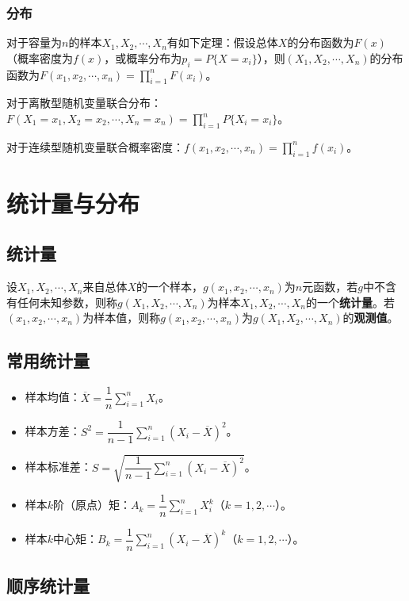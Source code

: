 \subsubsection{分布}

对于容量为$n$的样本$X_1,X_2,\cdots,X_n$有如下定理：假设总体$X$的分布函数为$F(x)$（概率密度为$f(x)$，或概率分布为$p_i=P\{X=x_i\}$），则$(X_1,X_2,\cdots,X_n)$的分布函数为$F(x_1,x_2,\cdots,x_n)=\prod\limits_{i=1}^nF(x_i)$。

对于离散型随机变量联合分布：$F(X_1=x_1,X_2=x_2,\cdots,X_n=x_n)=\prod\limits_{i=1}^nP\{X_i=x_i\}$。

对于连续型随机变量联合概率密度：$f(x_1,x_2,\cdots,x_n)=\prod\limits_{i=1}^nf(x_i)$。

\section{统计量与分布}

\subsection{统计量}

设$X_1,X_2,\cdots,X_n$来自总体$X$的一个样本，$g(x_1,x_2,\cdots,x_n)$为$n$元函数，若$g$中不含有任何未知参数，则称$g(X_1,X_2,\cdots,X_n)$为样本$X_1,X_2,\cdots,X_n$的一个\textbf{统计量}。若$(x_1,x_2,\cdots,x_n)$为样本值，则称$g(x_1,x_2,\cdots,x_n)$为$g(X_1,X_2,\cdots,X_n)$的\textbf{观测值}。

\subsection{常用统计量}

\begin{itemize}
    \item 样本均值：$\overline{X}=\dfrac{1}{n}\sum\limits_{i=1}^nX_i$。
    \item 样本方差：$S^2=\dfrac{1}{n-1}\sum\limits_{i=1}^n(X_i-\overline{X})^2$。
    \item 样本标准差：$S=\sqrt{\dfrac{1}{n-1}\sum\limits_{i=1}^n(X_i-\overline{X})^2}$。
    \item 样本$k$阶（原点）矩：$A_k=\dfrac{1}{n}\sum\limits_{i=1}^nX_i^k$（$k=1,2,\cdots$）。
    \item 样本$k$中心矩：$B_k=\dfrac{1}{n}\sum\limits_{i=1}^n(X_i-\overline{X})^k$（$k=1,2,\cdots$）。
\end{itemize}

\subsection{顺序统计量}

